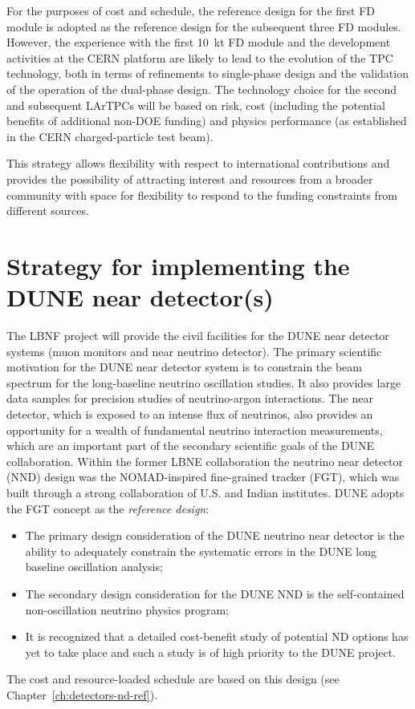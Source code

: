 For the purposes of cost and schedule, the reference design for the
first FD module is adopted as the reference design for the subsequent
three FD modules. However, the experience with the first 10~kt FD
module and the development activities at the CERN platform are likely
to lead to the evolution of the TPC technology, both in terms of
refinements to single-phase design and the validation of the operation
of the dual-phase design.  The technology choice for the second and
subsequent LArTPCs will be based on risk, cost (including the
potential benefits of additional non-DOE funding) and physics
performance (as established in the CERN charged-particle test beam).

This strategy allows flexibility with respect to international
contributions and provides the possibility of attracting interest and
resources from a broader community with space for flexibility to
respond to the funding constraints from different sources.

\section{Strategy for implementing the DUNE near detector(s)}

The LBNF project will provide the civil facilities for the DUNE near
detector systems (muon monitors and near neutrino detector). The
primary scientific motivation for the DUNE near detector system is to
constrain the beam spectrum for the long-baseline neutrino oscillation
studies. It also provides large data samples for precision studies of
neutrino-argon interactions. The near detector, which is exposed to an
intense flux of neutrinos, also provides an opportunity for a wealth
of fundamental neutrino interaction measurements, which are an
important part of the secondary scientific goals of the DUNE
collaboration. Within the former LBNE collaboration the neutrino near
detector (NND) design was the NOMAD-inspired fine-grained tracker
(FGT), which was built through a strong collaboration of U.S. and
Indian institutes. DUNE adopts the FGT concept as the
\textit{reference design}:
\begin{itemize}
\item The primary design consideration of the DUNE neutrino near
  detector is the ability to adequately constrain the systematic
  errors in the DUNE long baseline oscillation analysis;
\item The secondary design consideration for the DUNE NND is the
  self-contained non-oscillation neutrino physics program;
\item It is recognized that a detailed cost-benefit study of potential
  ND options has yet to take place and such a study is of high
  priority to the DUNE project.
\end{itemize}
The cost and resource-loaded schedule are based on this design (see
Chapter~\ref{ch:detectors-nd-ref}).


